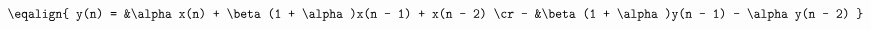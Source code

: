 \hsize 0pt
\vsize 0pt
\nopagenumbers
\overfullrule 0pt
\noindent
$$
\eqalign {
y(n) = &\alpha x(n) + \beta(1 + \alpha)x(n - 1) + x(n - 2)
\cr
- &\beta(1 + \alpha)y(n - 1)  - \alpha y(n - 2)
}
$$
\bye